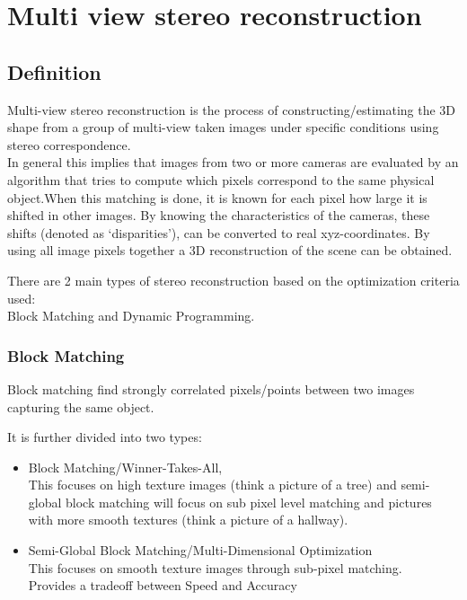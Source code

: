 \documentclass{article}[11pt]
\begin{document}
\section{Multi view stereo reconstruction}
\subsection{Definition}

Multi-view stereo reconstruction is the process of constructing/estimating the 3D shape from a group of multi-view taken images under specific conditions using stereo correspondence.
\\In general this implies that images from two or more cameras are evaluated by an algorithm that tries to compute which pixels correspond to the same physical object.When this matching is done, it is known for each pixel how large it is shifted in other images. By knowing the characteristics of the cameras, these shifts (denoted as ‘disparities’), can be converted to real xyz-coordinates. By using all image pixels together a 3D reconstruction of the scene can be obtained.

There are 2 main types of stereo reconstruction based on the optimization criteria used:
\\ Block Matching and Dynamic Programming.
\subsubsection{Block Matching}
Block matching find strongly correlated pixels/points between two images capturing the same object. 

It is further divided into two types:


\begin{itemize}
    \item Block Matching/Winner-Takes-All,
    \\This focuses on high texture images (think a picture of a tree) and semi-global block matching will focus on sub pixel level matching and pictures with more smooth textures (think a picture of a hallway).
    \item Semi-Global Block Matching/Multi-Dimensional Optimization
    \\ This focuses on smooth texture images through sub-pixel matching.
    \\ Provides a tradeoff between Speed and Accuracy
\end{itemize}
\end{document}
